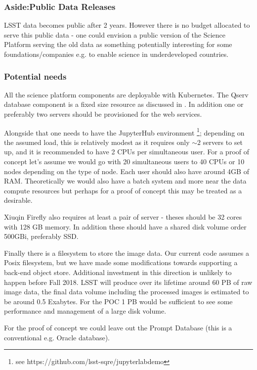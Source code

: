 \subsubsection {Aside:Public Data Releases}
LSST data becomes public after 2 years. However there is no budget allocated to serve this public data - one could envision a public version of the Science Platform serving the old data as something potentially interesting for some foundations/companies e.g. to enable science in underdeveloped countries.

\subsubsection {Potential needs}
All the science platform components are deployable with Kubernetes.   The Qserv database component is a fixed size resource as discussed in .
In addition one or preferably two servers should be provisioned for the  web services.

Alongside that one needs to have the JupyterHub environment \footnote{see https://github.com/lsst-sqre/jupyterlabdemo}; depending on the assumed load, this is relatively modest as it requires only $\sim2$ servers to set up, and it is recommended to have 2 CPUs per simultaneous user. For a proof of concept let's assume we would go with 20 simultaneous users to 40 CPUs or 10 nodes depending on the type of node. Each user should also have around 4GB of RAM.
Theoretically we would also have a batch system and more near the data compute resources but perhaps for a proof of concept this may be treated as a desirable.

{\color{red} Xiuqin }
Firefly also requires at least a pair of  server - theses should be 32 cores
with 128 GB memory. In addition these should have a shared disk volume order 500GBi, preferably SSD.

Finally there is a filesystem to store the image data. Our current code assumes a Posix filesystem, but we have made some modifications towards supporting a back-end object store. Additional investment in this direction is unlikely to happen before Fall 2018. LSST will produce over its lifetime around 60 PB of raw image data,  the final data volume including the processed images is estimated to be around 0.5 Exabytes.  For the POC 1 PB would be sufficient to see some performance and management of a large disk volume.

For the proof of concept we could leave out the Prompt Database (this is a conventional e.g. Oracle database).

